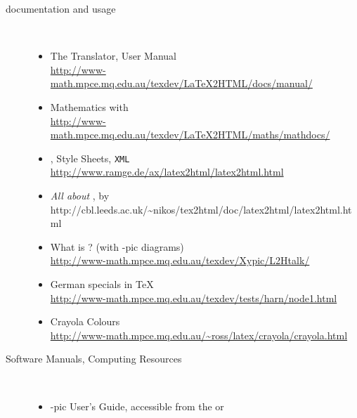 \begin{description}
%
\item [\latextohtml{} documentation and usage]~%
\begin{itemize}
\item
The \latextohtml{} Translator, User Manual\\
\url{http://www-math.mpce.mq.edu.au/texdev/LaTeX2HTML/docs/manual/}\\
\onlinedoc
\html{\smallskip}%

\item
Mathematics with \latextohtml{}\\
\url{http://www-math.mpce.mq.edu.au/texdev/LaTeX2HTML/maths/mathdocs/}
\html{\smallskip}%

\item
\latextohtml, Style Sheets, \texttt{XML}\\
\url{http://www.ramge.de/ax/latex2html/latex2html.html}
\html{\smallskip}%

\item
\textit{All about }\latextohtml, by %
{http://cbl.leeds.ac.uk/\~{}nikos/tex2html/doc/latex2html/latex2html.html}
\html{\smallskip}%

\item
What is \latextohtml{}? (with \Xy-pic diagrams)\\
\url{http://www-math.mpce.mq.edu.au/texdev/Xypic/L2Htalk/}
\html{\smallskip}%

\item
German specials in \TeX\\
\url{http://www-math.mpce.mq.edu.au/texdev/tests/harn/node1.html}
\html{\smallskip}%

\item
Crayola Colours\\
\url{http://www-math.mpce.mq.edu.au/~ross/latex/crayola/crayola.html}
\html{\smallskip}%


%

\end{itemize}

\htmlrule[50\% center]


\item[Software Manuals, Computing Resources]~%
\begin{itemize}
%
\item
\Xy-pic User's Guide, accessible from the
or 
\html{\smallskip}%


\end{itemize}
\end{description}
